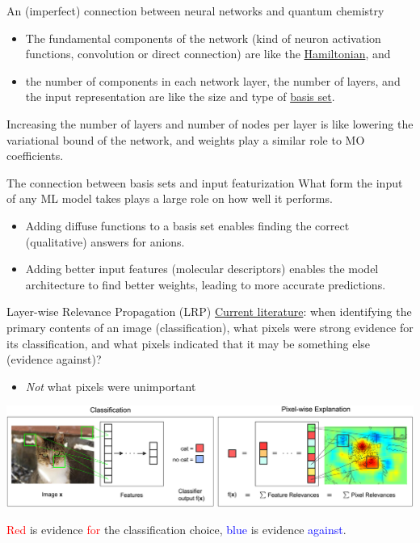 \documentclass[xetex,compress]{beamer}
\begin{document}
\begin{frame}{An (imperfect) connection between neural networks and quantum chemistry}
  \begin{itemize}
  \item The fundamental components of the network (kind of neuron activation functions, convolution or direct connection) are like the \underline{Hamiltonian}, and
  \item the number of components in each network layer, the number of layers, and the input representation are like the size and type of \underline{basis set}.
  \end{itemize}
  Increasing the number of layers and number of nodes per layer is like lowering the variational bound of the network, and weights play a similar role to MO coefficients.
\end{frame}

\begin{frame}{The connection between basis sets and input featurization}
  What form the input of any ML model takes plays a large role on how well it performs.
  \begin{itemize}
  \item Adding diffuse functions to a basis set enables finding the correct (qualitative) answers for anions.
  \item Adding better input features (molecular descriptors) enables the model architecture to find better weights, leading to more accurate predictions.
  \end{itemize}
\end{frame}

\begin{frame}{Layer-wise Relevance Propagation (LRP)}
  \underline{Current literature}: when identifying the primary contents of an image (classification), what pixels were strong evidence for its classification, and what pixels indicated that it may be something else (evidence against)?
  \begin{itemize}
  \item \emph{Not} what pixels were unimportant
  \end{itemize}
  \begin{center}
    \includegraphics[width=1.00\textwidth]{./figures/2-Figure1-1.png}
  \end{center}
  \textcolor{red}{Red} is evidence \textcolor{red}{for} the classification choice, \textcolor{blue}{blue} is evidence \textcolor{blue}{against}.
\end{frame}
\end{document}
